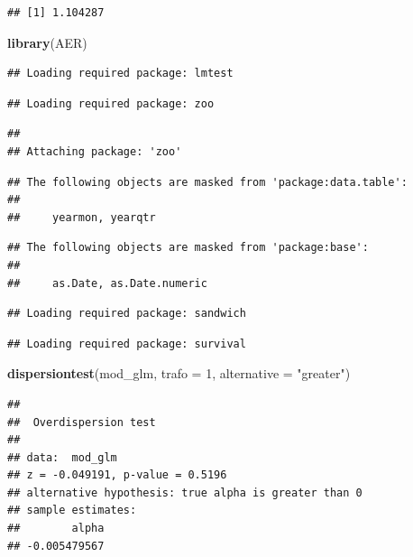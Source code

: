 \documentclass[
]{book}
\newenvironment{Shaded}{\begin{snugshade}}{\end{snugshade}}
\newcommand{\AttributeTok}[1]{\textcolor[rgb]{0.13,0.29,0.53}{#1}}
\newcommand{\DecValTok}[1]{\textcolor[rgb]{0.00,0.00,0.81}{#1}}
\newcommand{\FunctionTok}[1]{\textcolor[rgb]{0.13,0.29,0.53}{\textbf{#1}}}
\newcommand{\NormalTok}[1]{#1}
\newcommand{\StringTok}[1]{\textcolor[rgb]{0.31,0.60,0.02}{#1}}
\begin{document}
\begin{verbatim}
## [1] 1.104287
\end{verbatim}

\begin{Shaded}
\begin{Highlighting}[]
\FunctionTok{library}\NormalTok{(AER)}
\end{Highlighting}
\end{Shaded}

\begin{verbatim}
## Loading required package: lmtest
\end{verbatim}

\begin{verbatim}
## Loading required package: zoo
\end{verbatim}

\begin{verbatim}
## 
## Attaching package: 'zoo'
\end{verbatim}

\begin{verbatim}
## The following objects are masked from 'package:data.table':
## 
##     yearmon, yearqtr
\end{verbatim}

\begin{verbatim}
## The following objects are masked from 'package:base':
## 
##     as.Date, as.Date.numeric
\end{verbatim}

\begin{verbatim}
## Loading required package: sandwich
\end{verbatim}

\begin{verbatim}
## Loading required package: survival
\end{verbatim}

\begin{Shaded}
\begin{Highlighting}[]
\FunctionTok{dispersiontest}\NormalTok{(mod\_glm, }\AttributeTok{trafo =} \DecValTok{1}\NormalTok{, }\AttributeTok{alternative =} \StringTok{"greater"}\NormalTok{) }
\end{Highlighting}
\end{Shaded}

\begin{verbatim}
## 
##  Overdispersion test
## 
## data:  mod_glm
## z = -0.049191, p-value = 0.5196
## alternative hypothesis: true alpha is greater than 0
## sample estimates:
##        alpha 
## -0.005479567
\end{verbatim}
\end{document}
